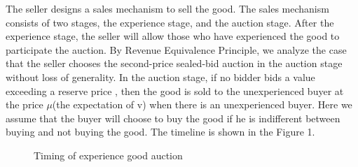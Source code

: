 The seller designs a sales mechanism to sell the
good. The sales mechanism consists of two stages, the experience stage, and the auction stage. 
After the experience stage, the seller will allow those who
have experienced the good to
participate the auction. By Revenue Equivalence Principle, we analyze the case that the seller chooses the second-price
sealed-bid auction in the auction stage without loss of generality. In the auction stage, if no bidder bids a value exceeding a reserve price
, then the good is sold to the unexperienced buyer at the
price $\mu$(the expectation of v) when there is an unexperienced buyer. Here we assume that the buyer will choose to buy the good if he is indifferent between buying and not buying the good. 
The timeline is shown in the Figure 1. 
\begin{figure}
\begin{center}
\end{center}
 \caption{Timing of experience good auction }
\end{figure}

